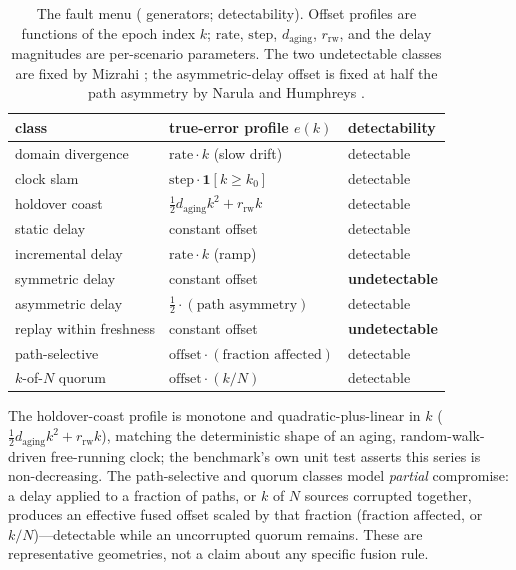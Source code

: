 \begin{table}[t]
  \centering
  \caption{The fault menu (\Modelled{} generators; \Cited{} detectability). Offset
  profiles are functions of the epoch index $k$; $\mathrm{rate}$, $\mathrm{step}$,
  $d_{\mathrm{aging}}$, $r_{\mathrm{rw}}$, and the delay magnitudes are
  per-scenario parameters. The two undetectable classes are fixed by Mizrahi
  \citep{mizrahi7384}; the asymmetric-delay offset is fixed at half the path
  asymmetry by Narula and Humphreys \citep{narula2018}.}
  \label{tab:faults}
  \begin{tabular}{l l l}
    \toprule
    class & true-error profile $e(k)$ & detectability \\
    \midrule
    domain divergence     & $\mathrm{rate}\cdot k$ (slow drift)             & detectable \\
    clock slam            & $\mathrm{step}\cdot\mathbf 1[k\ge k_0]$          & detectable \\
    holdover coast        & $\tfrac12 d_{\mathrm{aging}}k^{2}+r_{\mathrm{rw}}k$ & detectable \\
    static delay          & constant offset                                 & detectable \\
    incremental delay     & $\mathrm{rate}\cdot k$ (ramp)                    & detectable \\
    symmetric delay       & constant offset                                 & \textbf{undetectable} \\
    asymmetric delay      & $\tfrac12\cdot(\text{path asymmetry})$           & detectable \\
    replay within freshness & constant offset                               & \textbf{undetectable} \\
    path-selective        & $\text{offset}\cdot(\text{fraction affected})$  & detectable \\
    $k$-of-$N$ quorum     & $\text{offset}\cdot(k/N)$                        & detectable \\
    \bottomrule
  \end{tabular}
\end{table}

The holdover-coast profile is monotone and quadratic-plus-linear in $k$
($\tfrac12 d_{\mathrm{aging}}k^{2}+r_{\mathrm{rw}}k$), matching the deterministic
shape of an aging, random-walk-driven free-running clock; the benchmark's own unit
test asserts this series is non-decreasing. The path-selective and quorum classes
model \emph{partial} compromise: a delay applied to a fraction of paths, or $k$ of
$N$ sources corrupted together, produces an effective fused offset scaled by that
fraction ($\text{fraction affected}$, or $k/N$)---detectable while an uncorrupted
quorum remains. These are representative geometries, not a claim about any specific
fusion rule.

